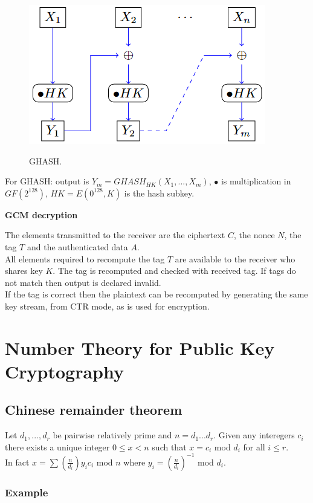\documentclass{article}
\begin{document}
\begin{figure}[H]
\centering
\includegraphics[scale=0.75]{Images/ghash.png}
\label{fig:fround}
\caption{GHASH.}
\end{figure}

For GHASH: output is $Y_m=GHASH_{HK} (X_1,...,X_m)$, $\bullet$ is multiplication in $GF(2^{128})$, $HK=E(0^128,K)$ is the hash subkey.

\textbf{GCM decryption}

The elements transmitted to the receiver are the ciphertext $C$, the nonce $N$, the tag $T$ and the authenticated data $A$.\\
All elements required to recompute the tag $T$ are available to the receiver who shares key $K$. The tag is recomputed and checked with received tag. If tags do not match then output is declared invalid.\\
If the tag is correct then the plaintext can be recomputed by generating the same key stream, from CTR mode, as is used for encryption.


\newpage \section{Number Theory for Public Key Cryptography}

\subsection{Chinese remainder theorem}

Let $d_1,..., d_r$ be pairwise relatively prime and $n= d_1 ... d_r$. Given any interegers $c_i$ there exists a unique integer $0 \leq x < n$ such that $x=c_i$ mod $d_i$ for all $i \leq r$.\\
In fact $x = \sum (\frac{n}{d_i})y_i c_i$ mod $n$ where $y_i = (\frac{n}{d_i})^{-1}$ mod $d_i$.

\subsubsection{Example}
\end{document}

